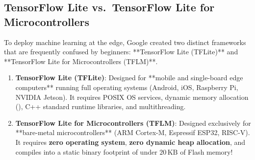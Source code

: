 \subsection{TensorFlow Lite vs.\ TensorFlow Lite for Microcontrollers}\label{subsec:tflite_vs_tflm}

To deploy machine learning at the edge, Google created two distinct frameworks that are frequently confused by beginners: **TensorFlow Lite (TFLite)** and **TensorFlow Lite for Microcontrollers (TFLM)**.

\begin{keyidea}
\begin{enumerate}
    \item \textbf{TensorFlow Lite (TFLite)}: Designed for **mobile and single-board edge computers** running full operating systems (Android, iOS, Raspberry Pi, NVIDIA Jetson). It requires POSIX OS services, dynamic memory allocation (), C++ standard runtime libraries, and multithreading.
    \item \textbf{TensorFlow Lite for Microcontrollers (TFLM)}: Designed exclusively for **bare-metal microcontrollers** (ARM Cortex-M, Espressif ESP32, RISC-V). It requires \textbf{zero operating system}, \textbf{zero dynamic heap allocation}, and compiles into a static binary footprint of under $20\,\text{KB}$ of Flash memory!
\end{enumerate}
\end{keyidea}

